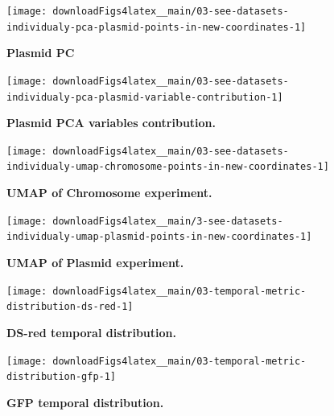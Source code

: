 \documentclass[a4paper, nobind]{templates/ociamthesis}
\begin{document}
\begin{figure}[H]
\texttt{[image: downloadFigs4latex\_\_main/03-see-datasets-individualy-pca-plasmid-points-in-new-coordinates-1]} \caption[Plasmid PCA.]{\textbf{Plasmid PC}}\label{fig:03-see-datasets-individualy-pca-plasmid-points-in-new-coordinates-1}
\end{figure}





\begin{figure}[H]
\texttt{[image: downloadFigs4latex\_\_main/03-see-datasets-individualy-pca-plasmid-variable-contribution-1]} \caption[Plasmid PCA variables contribution.]{\textbf{Plasmid PCA variables contribution.}}\label{fig:03-see-datasets-individualy-pca-plasmid-variable-contribution-1}
\end{figure}





\begin{figure}[H]
\texttt{[image: downloadFigs4latex\_\_main/03-see-datasets-individualy-umap-chromosome-points-in-new-coordinates-1]} \caption[UMAP of Chromosome experiment.]{\textbf{UMAP of Chromosome experiment.}}\label{fig:03-see-datasets-individualy-umap-chromosome-points-in-new-coordinates-1}
\end{figure}





\begin{figure}[H]
\texttt{[image: downloadFigs4latex\_\_main/3-see-datasets-individualy-umap-plasmid-points-in-new-coordinates-1]} \caption[UMAP of Plasmid experiment.]{\textbf{UMAP of Plasmid experiment.}}\label{fig:3-see-datasets-individualy-umap-plasmid-points-in-new-coordinates-1}
\end{figure}





\begin{figure}[H]
\texttt{[image: downloadFigs4latex\_\_main/03-temporal-metric-distribution-ds-red-1]} \caption[DS-red temporal distribution.]{\textbf{DS-red temporal distribution.}}\label{fig:03-temporal-metric-distribution-ds-red-1}
\end{figure}





\begin{figure}[H]
\texttt{[image: downloadFigs4latex\_\_main/03-temporal-metric-distribution-gfp-1]} \caption[GFP temporal distribution.]{\textbf{GFP temporal distribution.}}\label{fig:03-temporal-metric-distribution-gfp-1}
\end{figure}
\end{document}

